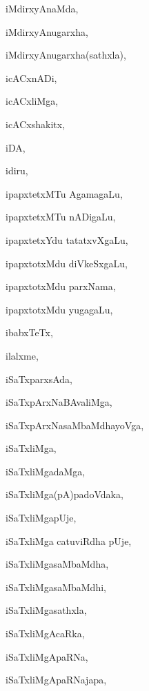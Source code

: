 \begin{multicols}{2}
{iMdirxyAnaMda}, \pageref{iMdirxyAnaMda}

{iMdirxyAnugarxha}, \pageref{iMdirxyAnugarxha}

{iMdirxyAnugarxha(sathxla)}, \pageref{iMdirxyAnugarxha(sathxla)}

{icACxnADi}, \pageref{icACxnADi}

{icACxliMga}, \pageref{icACxliMga}

{icACxshakitx}, \pageref{icACxshakitx}

{iDA}, \pageref{iDA}

{idiru}, \pageref{idiru}

{ipapxtetxMTu AgamagaLu}, \pageref{ipapxtetxMTu AgamagaLu}

{ipapxtetxMTu nADigaLu}, \pageref{ipapxtetxMTu nADigaLu}

{ipapxtetxYdu tatatxvXgaLu}, \pageref{ipapxtetxYdu tatatxvXgaLu}

{ipapxtotxMdu diVkeSxgaLu}, \pageref{ipapxtotxMdu diVkeSxgaLu}

{ipapxtotxMdu parxNama}, \pageref{ipapxtotxMdu parxNama}

{ipapxtotxMdu yugagaLu}, \pageref{ipapxtotxMdu yugagaLu}

{ibabxTeTx}, \pageref{ibabxTeTx}

{ilalxme}, \pageref{ilalxme}

{iSaTxparxsAda}, \pageref{iSaTxparxsAda}

{iSaTxpArxNaBAvaliMga}, \pageref{iSaTxpArxNaBAvaliMga}

{iSaTxpArxNasaMbaMdhayoVga}, \pageref{iSaTxpArxNasaMbaMdhayoVga}

{iSaTxliMga}, \pageref{iSaTxliMga}

{iSaTxliMgadaMga}, \pageref{iSaTxliMgadaMga}

{iSaTxliMga(pA)padoVdaka}, \pageref{iSaTxliMga(pA)padoVdaka}

{iSaTxliMgapUje}, \pageref{iSaTxliMgapUje}

{iSaTxliMga catuviRdha pUje}, \pageref{iSaTxliMga catuviRdha pUje}

{iSaTxliMgasaMbaMdha}, \pageref{iSaTxliMgasaMbaMdha}

{iSaTxliMgasaMbaMdhi}, \pageref{iSaTxliMgasaMbaMdhi}

{iSaTxliMgasathxla}, \pageref{iSaTxliMgasathxla}

{iSaTxliMgAcaRka}, \pageref{iSaTxliMgAcaRka}

{iSaTxliMgApaRNa}, \pageref{iSaTxliMgApaRNa}

{iSaTxliMgApaRNajapa}, \pageref{iSaTxliMgApaRNajapa}


\end{multicols}
